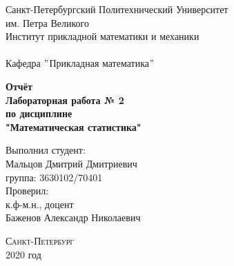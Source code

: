 \documentclass[a4]{article}
\begin{document}
	\def\contentsname{\LARGE{Содержание}}
	\thispagestyle{empty}
	\begin{center} 
		\vspace{2cm} 
		{\Large \sc Санкт-Петербургский Политехнический Университет}\\
		\vspace{2mm}
		{\Large\sc им. Петра Великого}\\
		\vspace{1cm}
		{\large \sc Институт прикладной математики и механики\\ 
			\vspace{0.5mm}
			\textsc{}}\\ 
		\vspace{0.5mm}
		{\large\sc Кафедра $"$Прикладная математика$"$}\\
		\vspace{15mm}
		
		
		{\sc \textbf{Отчёт\\
			Лабораторная работа № 2\\
			по дисциплине\\
			"Математическая статистика"}
			\vspace{6mm}
			
		}
		\vspace*{2mm}
		
		
		\begin{flushleft}
			\vspace{4cm}
			\sc Выполнил студент:\\
			\sc Мальцов Дмитрий Дмитриевич\\
			\sc группа: 3630102/70401\\
			\vspace{1cm}
			\sc Проверил:\\
			\sc к.ф-м.н., доцент\\
			\sc Баженов Александр Николаевич
			\vspace{20mm}
		\end{flushleft}
	\end{center} 
	\begin{center}
		\vfill {\large\textsc{Санкт-Петербург}}\\ 
		2020 год
	\end{center}
	
	\newpage
	\pagestyle{plain}
	
	
	
\end{document}
